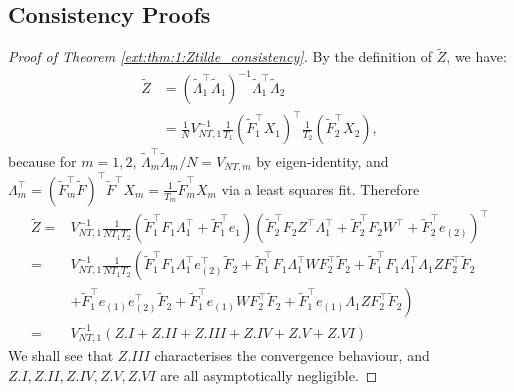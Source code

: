 \documentclass[12pt]{article}
\newcommand*{\tran}{\intercal}
\theoremstyle{plain}
\numberwithin{equation}{section}
\begin{document}
\subsection{Consistency Proofs}

\begin{proof}[Proof of Theorem \ref{ext:thm:1:Ztilde_consistency}]
By the definition of $\tilde{Z}$, we have:
\begin{align*}
\tilde{Z} &= 
\left( \tilde{\Lambda}_1^\tran \tilde{\Lambda}_1\right)^{-1} \tilde{\Lambda}_1^\tran \tilde{\Lambda}_2 \\
&= \frac{1}{N}V_{NT, 1}^{-1} \frac{1}{T_1}(\tilde{F}_1^\tran X_1)^\tran  \frac{1}{T_2} (\tilde{F}_2^\tran X_2),
\end{align*}
because for $m = 1, 2$, $\tilde{\Lambda}_m^\tran \tilde{\Lambda}_m/N = V_{NT, m}$ by eigen-identity, and $\Lambda_{m}^\tran = (\tilde{F}_m^\tran \tilde{F})^\tran \tilde{F}^\tran X_m = \frac{1}{T_m} \tilde{F}_m^\tran X_m$ via a least squares fit. Therefore
\begin{align*}
\tilde{Z} = &V_{NT, 1}^{-1} \frac{1}{N T_1 T_2} 
\left( 
	\tilde{F}_1^\tran F_1 \Lambda_1^\tran + \tilde{F}_1^\tran e_1
\right) 
\left( 
	\tilde{F}_2^\tran F_2 Z^\tran \Lambda_1^\tran + \tilde{F}_2^\tran F_2 W^\tran + \tilde{F}_2^\tran e_{(2)}
\right)^\tran \\
= &V_{NT, 1}^{-1} \frac{1}{N T_1 T_2}  \left( 
\tilde{F}_1^\tran F_1 \Lambda_1^\tran e_{(2)}^\tran \tilde{F}_2 +
\tilde{F}_1^\tran F_1 \Lambda_1^\tran W F_2^\tran \tilde{F}_2 +
\tilde{F}_1^\tran F_1 \Lambda_1^\tran \Lambda_1 Z F_2^\tran \tilde{F}_2 \right. \\
&+ \left. \tilde{F}_1^\tran e_{(1)} e_{(2)}^\tran \tilde{F}_2 +
\tilde{F}_1^\tran e_{(1)} W F_2^\tran \tilde{F}_2 +
\tilde{F}_1^\tran e_{(1)} \Lambda_1 Z F_2^\tran \tilde{F}_2
\right) \\
= &V_{NT, 1}^{-1} (Z.I + Z.II + Z.III + Z.IV + Z.V + Z.VI)
\end{align*}
We shall see that $Z.III$ characterises the convergence behaviour, and $Z.I, Z.II, Z.IV, Z.V, Z.VI$ are all asymptotically negligible.


\end{proof}
\end{document}
